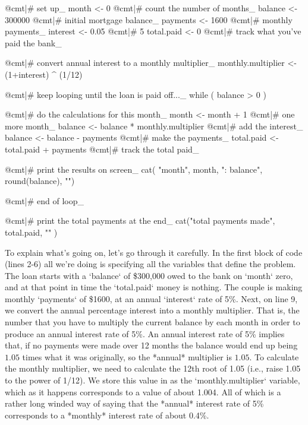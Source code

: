 \begin{script}
@cmt|# set up_
month <- 0  @cmt|# count the number of months_
balance <- 300000 @cmt|# initial mortgage balance_
payments <- 1600 @cmt|# monthly payments_
interest <- 0.05  @cmt|# 5%
total.paid <- 0 @cmt|# track what you've paid the bank_

@cmt|# convert annual interest to a monthly multiplier_
monthly.multiplier <- (1+interest) ^ (1/12)

@cmt|# keep looping until the loan is paid off..._
while ( balance > 0 ) {
  
  @cmt|# do the calculations for this month_
  month <- month + 1  @cmt|# one more month_
  balance <- balance * monthly.multiplier  @cmt|# add the interest_
  balance <- balance - payments  @cmt|# make the payments_
  total.paid <- total.paid + payments @cmt|# track the total paid_
  
  @cmt|# print the results on screen_
  cat( "month", month, ": balance", round(balance), "\n")
  
} @cmt|# end of loop_

@cmt|# print the total payments at the end_
cat("total payments made", total.paid, "\n" )
\end{script}
To explain what's going on, let's go through it carefully. In the first block of code (lines 2-6) all we're doing is specifying all the variables that define the problem. The loan starts with a `balance` of \$300,000 owed to the bank on `month` zero, and at that point in time the `total.paid` money is nothing. The couple is making monthly `payments` of \$1600, at an annual `interest` rate of 5\%. Next, on line 9, we convert the annual percentage interest into a monthly multiplier. That is, the number that you have to multiply the current balance by each month in order to produce an annual interest rate of 5\%. An annual interest rate of 5\% implies that, if no payments were made over 12 months the balance would end up being $1.05$ times what it was originally, so the *annual* multiplier is $1.05$. To calculate the monthly multiplier, we need to calculate the 12th root of 1.05 (i.e., raise 1.05 to the power of 1/12). We store this value in as the `monthly.multiplier` variable, which as it happens corresponds to a value of about 1.004. All of which is a rather long winded way of saying that the *annual* interest rate of 5\% corresponds to a *monthly* interest rate of about 0.4\%. 

